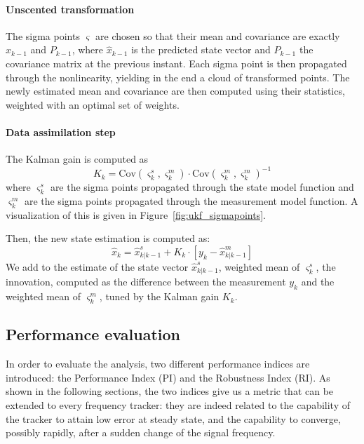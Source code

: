 \documentclass{article}
\begin{document}
\paragraph{Unscented transformation} The sigma points $\varsigma$ are chosen so that their mean and covariance are exactly $\hat{x}_{k-1}$ and $P_{k-1}$, where $\hat{x}_{k-1}$ is the predicted state vector and $P_{k-1}$ the covariance matrix at the previous instant. Each sigma point is then propagated through the nonlinearity, yielding in the end a cloud of transformed points. The newly estimated mean and covariance are then computed using their statistics, weighted with an optimal set of weights.

\paragraph{Data assimilation step} The Kalman gain is computed as 
$$K_k = \mathrm{Cov}(\varsigma^s_k,\varsigma^m_k) \cdot \mathrm{Cov}(\varsigma^m_k,\varsigma^m_k)^{-1}  $$
where $\varsigma^s_k$ are the sigma points propagated through the state model function and $\varsigma^m_k$ are the sigma points propagated through the measurement model function. A visualization of this is given in Figure~\ref{fig:ukf_sigmapoints}.

Then, the new state estimation is computed as:
$$\hat{x}_k = \hat{x}^s_{k|k-1} + K_k\cdot\left[y_k - \hat{x}^m_{k|k-1}\right]$$
We add to the estimate of the state vector $\hat{x}^s_{k|k-1}$, weighted mean of $\varsigma^s_{k}$, the innovation, computed as the difference between the measurement $y_k$ and the weighted mean of $\varsigma^m_k$, tuned by the Kalman gain $K_k$.

\subsection{Performance evaluation}
In order to evaluate the analysis, two different performance indices are introduced: the Performance Index (PI) and the Robustness Index (RI). As shown in the following sections, the two indices give us a metric that can be extended to every frequency tracker: they are indeed related to the capability of the tracker to attain low error at steady state, and the capability to converge, possibly rapidly, after a sudden change of the signal frequency.


\end{document}
